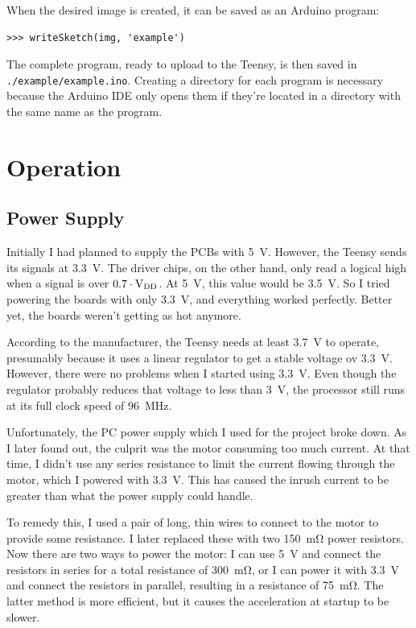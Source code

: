\documentclass[a4paper, 11pt, titlepage]{report}
\def \vdd {V\textsubscript{DD}}
\begin{document}
When the desired image is created, it can be saved as an Arduino program:

\begin{lstlisting}
>>> writeSketch(img, 'example')
\end{lstlisting}
\vspace{-2mm}

The complete program, ready to upload to the Teensy, is then saved in
\texttt{./example/example.ino}. Creating a directory for each program is necessary because the
Arduino IDE only opens them if they're located in a directory with the same name as the program.

\chapter{Operation}

\section{Power Supply}

Initially I had planned to supply the PCBs with \SI{5}{\volt}. However, the Teensy sends its
signals at \SI{3.3}{\volt}. The driver chips, on the other hand, only read a logical high when a
signal is over $0.7 \cdot \textrm{\vdd}$. At \SI{5}{\volt}, this value would be \SI{3.5}{\volt}.
So I tried powering the boards with only \SI{3.3}{\volt}, and everything worked perfectly. Better
yet, the boards weren't getting as hot anymore.

According to the manufacturer, the Teensy needs at least \SI{3.7}{\volt} to operate, presumably
because it uses a linear regulator to get a stable voltage ov \SI{3.3}{\volt}. However, there were
no problems when I started using \SI{3.3}{\volt}. Even though the regulator probably reduces that
voltage to less than \SI{3}{\volt}, the processor still runs at its full clock speed of
\SI{96}{\mega\hertz}.

Unfortunately, the PC power supply which I used for the project broke down. As I later found out,
the culprit was the motor consuming too much current. At that time, I didn't use any series
resistance to limit the current flowing through the motor, which I powered with \SI{3.3}{\volt}.
This has caused the inrush current to be greater than what the power supply could handle.

To remedy this, I used a pair of long, thin wires to connect to the motor to provide some
resistance. I later replaced these with two \SI{150}{\milli\ohm} power resistors. Now there are two
ways to power the motor: I can use \SI{5}{\volt} and connect the resistors in series for a total
resistance of \SI{300}{\milli\ohm}, or I can power it with \SI{3.3}{\volt} and connect the
resistors in parallel, resulting in a resistance of \SI{75}{\milli\ohm}. The latter method is more
efficient, but it causes the acceleration at startup to be slower.
\end{document}
